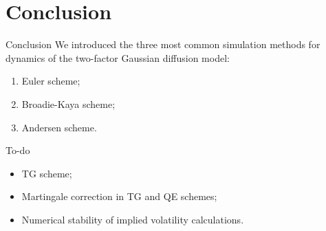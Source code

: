 \documentclass[aspectratio=169]{beamer}
\begin{document}
    \section{Conclusion}
        \begin{frame}{Conclusion}
            We introduced the three most common simulation methods for dynamics of the two-factor Gaussian diffusion model:
            \begin{enumerate}
                \item Euler scheme; 
                \item Broadie-Kaya scheme;
                \item Andersen scheme.
            \end{enumerate}
        \end{frame}
        \begin{frame}{To-do}
            \begin{itemize}
                \item TG scheme;
                \item Martingale correction in TG and QE schemes;
                \item Numerical stability of implied volatility calculations.
            \end{itemize}
        \end{frame}
\end{document}

